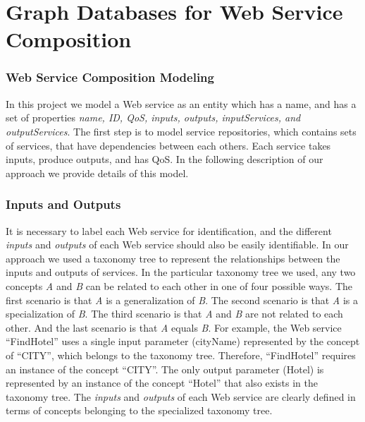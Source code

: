 \section{Graph Databases for Web Service Composition} \label{procesedGD}
\subsubsection {Web Service Composition Modeling}
In this project we model a Web service as an entity which has a name, and has a set of properties \emph{name, ID, QoS, inputs, outputs, inputServices, and outputServices}. The first step is to model service repositories, which contains sets of services, that have dependencies between each others. Each service takes inputs, produce outputs, and has QoS. In the following description of our approach we provide details of this model.\par
\subsubsection {Inputs and Outputs}
It is necessary to label each Web service for identification, and the different \emph{inputs} and  \emph{outputs} of each Web service should also be easily identifiable. In our approach we used a taxonomy tree to represent the relationships between the inputs and outputs of services. In the particular taxonomy tree we used, any two concepts \emph{A} and \emph{B} can be related to each other in one of four possible ways. The first scenario is that \emph{A} is a generalization of \emph{B}. The second scenario is that \emph{A} is a specialization of \emph{B}. The third scenario is that \emph{A} and \emph{B} are not related to each other. And the last scenario is that  \emph{A} equals \emph{B}. For example, the Web service \newcommand{\quotes}[1]{``#1''}\quotes{FindHotel} uses a single input parameter (cityName) represented by the concept of \quotes{CITY}, which belongs to the taxonomy tree. Therefore, \quotes{FindHotel} requires an instance of the concept \quotes{CITY}. The only output parameter (Hotel) is represented by an instance of the concept \quotes{Hotel} that also exists in the taxonomy tree. The \emph{inputs} and \emph{outputs} of each Web service are clearly defined in terms of concepts belonging to the specialized taxonomy tree.


